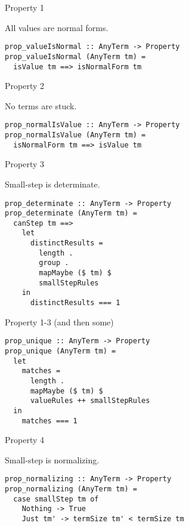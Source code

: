 \documentclass{beamer}
\begin{document}
\begin{frame}[fragile]
  Property 1
  \begin{center}
All values are normal forms.
  \end{center}
  \begin{verbatim}
prop_valueIsNormal :: AnyTerm -> Property
prop_valueIsNormal (AnyTerm tm) =
  isValue tm ==> isNormalForm tm
  \end{verbatim}
\end{frame}

\begin{frame}[fragile]
  Property 2
  \begin{center}
No terms are stuck.
  \end{center}
  \begin{verbatim}
prop_normalIsValue :: AnyTerm -> Property
prop_normalIsValue (AnyTerm tm) =
  isNormalForm tm ==> isValue tm
  \end{verbatim}
\end{frame}

\begin{frame}[fragile]
  Property 3
  \begin{center}
Small-step is determinate.
  \end{center}
  \begin{verbatim}
prop_determinate :: AnyTerm -> Property
prop_determinate (AnyTerm tm) =
  canStep tm ==>
    let
      distinctResults =
        length .
        group .
        mapMaybe ($ tm) $
        smallStepRules
    in
      distinctResults === 1
  \end{verbatim}
\end{frame}

\begin{frame}[fragile]
Property 1-3 (and then some)
  \begin{verbatim}
prop_unique :: AnyTerm -> Property
prop_unique (AnyTerm tm) =
  let
    matches =
      length .
      mapMaybe ($ tm) $
      valueRules ++ smallStepRules
  in
    matches === 1
  \end{verbatim}
\end{frame}

\begin{frame}[fragile]
  Property 4
  \begin{center}
Small-step is normalizing.
  \end{center}
  \begin{verbatim}
prop_normalizing :: AnyTerm -> Property
prop_normalizing (AnyTerm tm) =
  case smallStep tm of
    Nothing -> True
    Just tm' -> termSize tm' < termSize tm
  \end{verbatim}
\end{frame}
\end{document}
